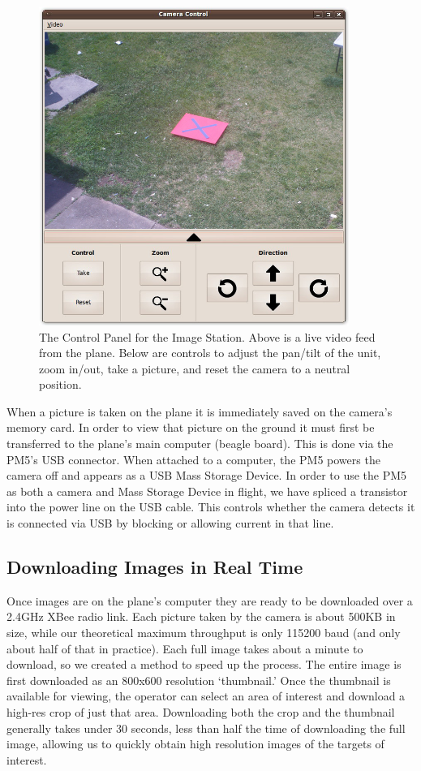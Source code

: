 \documentclass[10pt,twocolumns]{report}
\begin{document}
\begin{figure} [H]
  \centering
  	\includegraphics[width=0.9\textwidth]{../images/ImageStationControls.jpg}
  	\caption[Image Station Control Panel]{The Control Panel for the Image Station.  Above is a live video feed from the plane.  Below are controls to adjust the pan/tilt of the unit, zoom in/out, take a picture, and reset the camera to a neutral position.}
  	\label{fig:imagestationcontrols}
\end{figure}

When a picture is taken on the plane it is immediately saved on the camera's memory card.  In order to view that picture on the ground it must first be transferred to the plane's main computer (beagle board).  This is done via the PM5's USB connector.  When attached to a computer, the PM5 powers the camera off and appears as a USB Mass Storage Device. In order to use the PM5 as both a camera and Mass Storage Device in flight, we have spliced a transistor into the power line on the USB cable. This controls whether the camera detects it is connected via USB by blocking or allowing current in that line.

\subsection{Downloading Images in Real Time}

Once images are on the plane's computer they are ready to be downloaded over a 2.4GHz XBee radio link.  Each picture taken by the camera is about 500KB in size, while our theoretical maximum throughput is only 115200 baud (and only about half of that in practice).  Each full image takes about a minute to download, so we created a method to speed up the process.  The entire image is first downloaded as an 800x600 resolution `thumbnail.'  Once the thumbnail is available for viewing, the operator can select an area of interest and download a high-res crop of just that area.  Downloading both the crop and the thumbnail generally takes under 30 seconds, less than half the time of downloading the full image, allowing us to quickly obtain high resolution images of the targets of interest.
\end{document}
